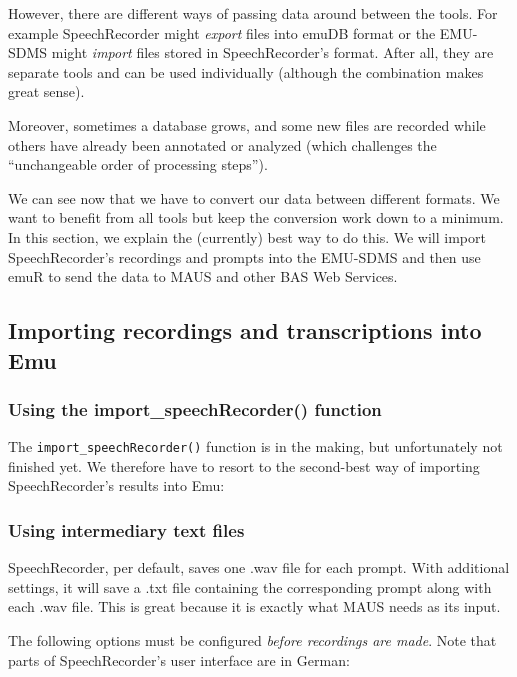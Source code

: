 \documentclass[]{book}
\theoremstyle{definition}
\theoremstyle{definition}
\theoremstyle{definition}
\theoremstyle{remark}
\begin{document}
However, there are different ways of passing data around between the
tools. For example SpeechRecorder might \emph{export} files into emuDB
format or the EMU-SDMS might \emph{import} files stored in
SpeechRecorder's format. After all, they are separate tools and can be
used individually (although the combination makes great sense).

Moreover, sometimes a database grows, and some new files are recorded
while others have already been annotated or analyzed (which challenges
the ``unchangeable order of processing steps'').

We can see now that we have to convert our data between different
formats. We want to benefit from all tools but keep the conversion work
down to a minimum. In this section, we explain the (currently) best way
to do this. We will import SpeechRecorder's recordings and prompts into
the EMU-SDMS and then use emuR to send the data to MAUS and other BAS
Web Services.

\subsection{Importing recordings and transcriptions into
Emu}\label{importing-recordings-and-transcriptions-into-emu}

\subsubsection{Using the import\_speechRecorder()
function}\label{using-the-import_speechrecorder-function}

The \texttt{import\_speechRecorder()} function is in the making, but
unfortunately not finished yet. We therefore have to resort to the
second-best way of importing SpeechRecorder's results into Emu:

\subsubsection{Using intermediary text
files}\label{using-intermediary-text-files}

SpeechRecorder, per default, saves one .wav file for each prompt. With
additional settings, it will save a .txt file containing the
corresponding prompt along with each .wav file. This is great because it
is exactly what MAUS needs as its input.

The following options must be configured \emph{before recordings are
made}. Note that parts of SpeechRecorder's user interface are in German:
\end{document}
